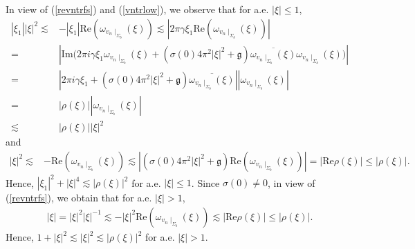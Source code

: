 \documentclass[11pt,letterpaper,reqno]{amsart}
\numberwithin{equation}{section}
\newcommand{\abs}[1]{\left\lvert#1\right\rvert}
\newcommand{\re}{\mbox{Re}}
\newcommand{\im}{\mbox{Im}}
\begin{document}
In view of (\ref{revntrfs}) and (\ref{vntrlow}), we observe that for a.e. \(\abs{\xi} \leq 1\),
\begin{align}
    \abs{\xi_{1}}\abs{\xi}^{2} \lesssim&-\abs{\xi_{1}}\re(\omega_{v_{n}\mid_{\Sigma_{b}}}(\xi)) \lesssim \abs{2\pi \gamma\xi_{1}\re(\omega_{v_{n}\mid_{\Sigma_{b}}}(\xi))} \nonumber\\
    =&\abs{\im\biggl(2\pi i \gamma\xi_{1}\omega_{v_{n}\mid_{\Sigma_{b}}}(\xi)+(\sigma(0)4\pi^{2}\abs{\xi}^{2}+\mathfrak{g})\overline{\omega_{v_{n}\mid_{\Sigma_{b}}}(\xi)}\omega_{v_{n}\mid_{\Sigma_{b}}}(\xi)\biggr)} \nonumber\\
    =&\abs{2\pi i \gamma\xi_{1}+(\sigma(0)4\pi^{2}\abs{\xi}^{2}+\mathfrak{g})\overline{\omega_{v_{n}\mid_{\Sigma_{b}}}(\xi)}}\abs{\omega_{v_{n}\mid_{\Sigma_{b}}}(\xi)} \nonumber\\
    =&\abs{\rho(\xi)}\abs{\omega_{v_{n}\mid_{\Sigma_{b}}}(\xi)} \nonumber\\
    \lesssim&\abs{\rho(\xi)}\abs{\xi}^{2}
\end{align}
and
\begin{align}
    \abs{\xi}^{2} \lesssim &-\re(\omega_{v_{n}\mid_{\Sigma_{b}}}(\xi))\lesssim \abs{(\sigma(0)4\pi^{2}\abs{\xi}^{2}+\mathfrak{g})\re(\omega_{v_{n}\mid_{\Sigma_{b}}}(\xi))} =\abs{\re\rho(\xi)} \leq \abs{\rho(\xi)}.
\end{align}
Hence, \(\abs{\xi_{1}}^{2} + \abs{\xi}^{4} \lesssim \abs{\rho(\xi)}^{2}\) for a.e. \(\abs{\xi} \leq 1\). Since \(\sigma(0) \neq 0\), in view of (\ref{revntrfs}), we obtain that for a.e. \(\abs{\xi} >1\),
\begin{align}
    \abs{\xi} =\abs{\xi}^{2}\abs{\xi}^{-1} \lesssim -\abs{\xi}^{2}\re(\omega_{v_{n} \mid_{\Sigma_{b}}}(\xi)) \lesssim \abs{\re\rho(\xi)} \leq \abs{\rho(\xi)}.
\end{align}
Hence, \(1+\abs{\xi}^{2} \lesssim \abs{\xi}^{2} \lesssim \abs{\rho(\xi)}^{2}\) for a.e. \(\abs{\xi}>1\).
\end{document}
